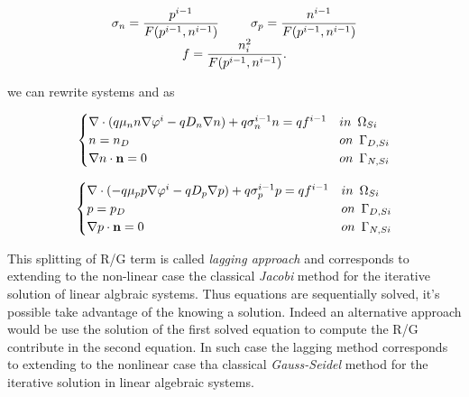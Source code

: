 \begin{equation}
\begin{array}{c}
\sigma_n  = \dfrac{p^{i-1}}{F(p^{i-1},n^{i-1})} \psp{15} \sigma_p   = \dfrac{n^{i-1}}{F(p^{i-1},n^{i-1})} \\
f  = \dfrac{n_i^2}{F(p^{i-1},n^{i-1})}.
\end{array}
\end{equation}

we can rewrite systems  and  as

\begin{equation}
\label{eq: LEC system new}
\begin{cases}
 \nabla \cdot ( q\mu_n n \nabla \varphi^i - qD_n \nabla n ) +q\sigma_n^{i-1} n = qf^{i-1} & in \psp{3} \Omega_{Si}
 \\
 n = n_D & on \psp{3} \Gamma_{D,Si}
 \\
 \nabla n \cdot \vect{n} = 0 & on \psp{3} \Gamma_{N,Si}
\end{cases}
\end{equation}

\begin{equation}
\label{eq: LHC system new}
\begin{cases}
\nabla \cdot (- q\mu_p p \nabla \varphi^i - qD_p \nabla p ) + q\sigma_p^{i-1} p =  qf^{i-1}& in \psp{3} \Omega_{Si}
\\
 p = p_D & on \psp{3} \Gamma_{D,Si}
 \\
 \nabla p \cdot \vect{n} = 0 & on \psp{3} \Gamma_{N,Si}
\end{cases}
\end{equation}


This splitting of R/G term is called \textit{lagging approach} and corresponds to extending to the non-linear case the classical \textit{Jacobi} method for the iterative  solution of linear algbraic systems. Thus equations are sequentially solved, it's possible take advantage of the knowing a solution. Indeed an alternative approach would be use the solution of the first solved equation to compute the R/G contribute in the second equation. In such case the lagging method corresponds to extending to the nonlinear case tha classical \textit{Gauss-Seidel} method for the iterative solution in linear algebraic systems.


